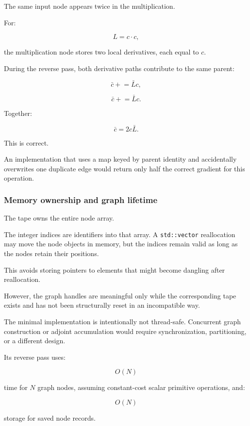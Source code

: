 The same input node appears twice in the multiplication.

For:

\[
L=c\cdot c,
\]

the multiplication node stores two local derivatives, each equal to \(c\).

During the reverse pass, both derivative paths contribute to the same parent:

\[
\bar c\mathrel{+}=\bar Lc,
\]

\[
\bar c\mathrel{+}=\bar Lc.
\]

Together:

\[
\bar c=2c\bar L.
\]

This is correct.

An implementation that uses a map keyed by parent identity and accidentally overwrites one duplicate edge would return only half the correct gradient for this operation.

\subsubsection{Memory ownership and graph lifetime}\label{02-foundations-ii-ch022-memory-ownership-and-graph-lifetime}

\hypertarget{02-foundations-ii-ch022-memory-ownership-and-graph-lifetime}{}

The tape owns the entire node array.

The integer indices are identifiers into that array. A \texttt{std::vector} reallocation may move the node objects in memory, but the indices remain valid as long as the nodes retain their positions.

This avoids storing pointers to elements that might become dangling after reallocation.

However, the graph handles are meaningful only while the corresponding tape exists and has not been structurally reset in an incompatible way.

The minimal implementation is intentionally not thread-safe. Concurrent graph construction or adjoint accumulation would require synchronization, partitioning, or a different design.

Its reverse pass uses:

\[
O(N)
\]

time for \(N\) graph nodes, assuming constant-cost scalar primitive operations, and:

\[
O(N)
\]

storage for saved node records.

